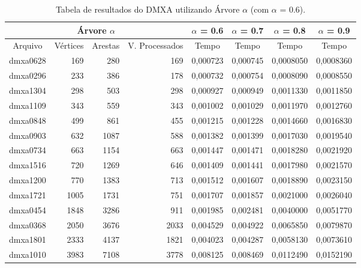 \documentclass[
	12pt,				%
	oneside,			%
	a4paper,			%
	english,			%
	french,				%
	spanish,			%
	brazil,				%
	]{abntex2}
\begin{document}
\begin{table}[ht!]
  \centering    
  \begin{tabular}{|c|r|r|r|r|r|r|r|}
    \toprule
    \multicolumn{4}{|c|}{\cellcolor{gray!25}\textbf{Árvore $\alpha$}} & \multicolumn{1}{|c|}{\cellcolor{gray!25}\textbf{$\alpha$ = 0.6}}     & \multicolumn{1}{|c|}{\cellcolor{gray!25}\textbf{$\alpha$ = 0.7}} & \multicolumn{1}{|c|}{\cellcolor{gray!25}\textbf{$\alpha$ = 0.8}} & \multicolumn{1}{|c|}{\cellcolor{gray!25}\textbf{$\alpha$ = 0.9}} \\
    \midrule
    \multicolumn{1}{|c|}{\cellcolor{gray!10}Arquivo} & \multicolumn{1}{|c|}{\cellcolor{gray!10}Vértices} & \multicolumn{1}{|c|}{\cellcolor{gray!10}Arestas} & \multicolumn{1}{|c|}{\cellcolor{gray!10}V. Processados} & 
    \multicolumn{1}{|c|}{\cellcolor{gray!10}Tempo} & \multicolumn{1}{|c|}{\cellcolor{gray!10}Tempo} &
    \multicolumn{1}{|c|}{\cellcolor{gray!10}Tempo} & \multicolumn{1}{|c|}{\cellcolor{gray!10}Tempo} \\
    \hline    
    dmxa0628	&	169	&	280	&	169	&	0,000723	&	0,000745	&	0,0008050	&	0,0008360	\\
    \hline
    dmxa0296	&	233	&	386	&	178	&	0,000732	&	0,000754	&	0,0008090	&	0,0008550	\\
    \hline
    dmxa1304	&	298	&	503	&	298	&	0,000927	&	0,000949	&	0,0011330	&	0,0011850	\\
    \hline
    dmxa1109	&	343	&	559	&	343	&	0,001002	&	0,001029	&	0,0011970	&	0,0012760	\\
    \hline
    dmxa0848	&	499	&	861	&	455	&	0,001215	&	0,001228	&	0,0014660	&	0,0016830	\\
    \hline
    dmxa0903	&	632	&	1087	&	588	&	0,001382	&	0,001399	&	0,0017030	&	0,0019540	\\
    \hline
    dmxa0734	&	663	&	1154	&	663	&	0,001447	&	0,001471	&	0,0018280	&	0,0021920	\\
    \hline
    dmxa1516	&	720	&	1269	&	646	&	0,001409	&	0,001441	&	0,0017980	&	0,0021570	\\
    \hline
    dmxa1200	&	770	&	1383	&	713	&	0,001512	&	0,001607	&	0,0018890	&	0,0023150	\\
    \hline
    dmxa1721	&	1005	&	1731	&	751	&	0,001707	&	0,001857	&	0,0021000	&	0,0026040	\\
    \hline
    dmxa0454	&	1848	&	3286	&	911	&	0,001985	&	0,002481	&	0,0040000	&	0,0051770	\\
    \hline
    dmxa0368	&	2050	&	3676	&	2033	&	0,004529	&	0,004922	&	0,0065850	&	0,0079870	\\
    \hline
    dmxa1801	&	2333	&	4137	&	1821	&	0,004023	&	0,004287	&	0,0058130	&	0,0073610	\\
    \hline
    dmxa1010	&	3983	&	7108	&	3778	&	0,008125	&	0,008469	&	0,0112490	&	0,0152190	\\
    \hline
  \end{tabular}
  \caption{Tabela de resultados do DMXA utilizando Árvore $\alpha$ (com $\alpha$ = 0.6).}  
  \label{tab:DmxaAlpha0.6}
\end{table}
\end{document}
